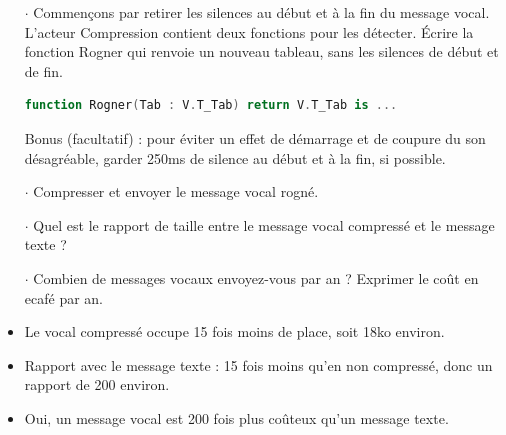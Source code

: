 \begin{reponse}

\end{reponse}
\fi

\begin{itemize}
\item[$\cdot$] Commençons par retirer les silences au début et à la fin du message vocal.
L'acteur Compression contient deux fonctions pour les détecter.
%
Écrire la fonction Rogner qui renvoie un nouveau tableau, sans les silences de début et de fin.
  \begin{lstlisting}[language=Ada]
   function Rogner(Tab : V.T_Tab) return V.T_Tab is ...
   \end{lstlisting}
%
Bonus (facultatif) : pour éviter un effet de démarrage et de coupure du son désagréable, garder 250ms de silence au début et à la fin, si possible.

\item[$\cdot$] Compresser et envoyer le message vocal rogné.
\end{itemize}



\begin{itemize}
\item[$\cdot$] Quel est le rapport de taille entre le message vocal compressé et le message texte ?
\item[$\cdot$] Combien de messages vocaux envoyez-vous par an ? Exprimer le coût en ecafé par an.
\end{itemize}

\begin{reponse}
\begin{itemize}
\item Le vocal compressé occupe 15 fois moins de place, soit 18ko environ.
\item Rapport avec le message texte : 15 fois moins qu'en non compressé, donc un rapport de 200 environ.
\item Oui, un message vocal est 200 fois plus coûteux qu'un message texte.
\end{itemize}
\end{reponse}






